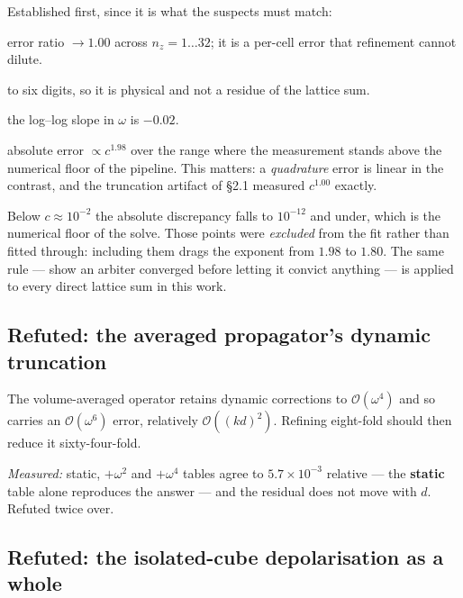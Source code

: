 \documentclass[11pt,a4paper]{article}
\begin{document}
Established first, since it is what the suspects must match:
\begin{description}[style=nextline,leftmargin=1.2em]
  \item[Saturating] error ratio $\to1.00$ across $n_z=1\ldots32$; it is a
    per-cell error that refinement cannot dilute.
  \item[Independent of $M$] to six digits, so it is physical and not a residue of
    the lattice sum.
  \item[Static] the log--log slope in $\omega$ is $-0.02$.
  \item[Quadratic in contrast] absolute error $\propto c^{1.98}$ over the range
    where the measurement stands above the numerical floor of the pipeline. This
    matters: a \emph{quadrature} error is linear in the contrast, and the
    truncation artifact of \S2.1 measured $c^{1.00}$ exactly.
\end{description}

\begin{tcolorbox}[colback=gray!5,colframe=black!62,
  title={A measurement discipline used throughout}]
Below $c\approx10^{-2}$ the absolute discrepancy falls to $10^{-12}$ and under,
which is the numerical floor of the solve. Those points were \emph{excluded} from
the fit rather than fitted through: including them drags the exponent from $1.98$
to $1.80$. The same rule --- show an arbiter converged before letting it convict
anything --- is applied to every direct lattice sum in this work.
\end{tcolorbox}

\subsection{Refuted: the averaged propagator's dynamic truncation}

The volume-averaged operator retains dynamic corrections to $\mathcal{O}(\omega^4)$
and so carries an $\mathcal{O}(\omega^6)$ error, relatively $\mathcal{O}((kd)^2)$.
Refining eight-fold should then reduce it sixty-four-fold.

\emph{Measured:} static, $+\omega^2$ and $+\omega^4$ tables agree to
$5.7\times10^{-3}$ relative --- the \textbf{static} table alone reproduces the
answer --- and the residual does not move with $d$. Refuted twice over.

\subsection{Refuted: the isolated-cube depolarisation as a whole}
\end{document}

